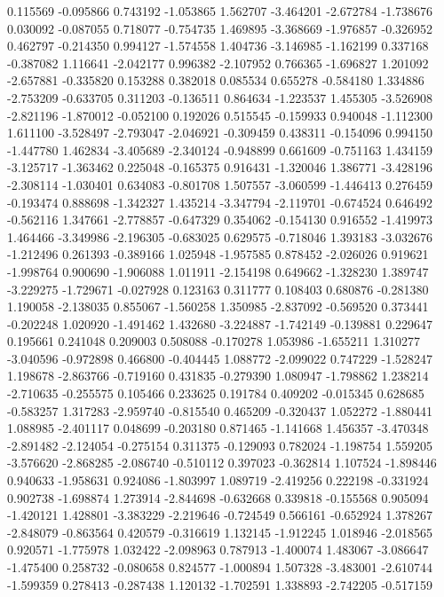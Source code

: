 0.115569
-0.095866
0.743192
-1.053865
1.562707
-3.464201
-2.672784
-1.738676
0.030092
-0.087055
0.718077
-0.754735
1.469895
-3.368669
-1.976857
-0.326952
0.462797
-0.214350
0.994127
-1.574558
1.404736
-3.146985
-1.162199
0.337168
-0.387082
1.116641
-2.042177
0.996382
-2.107952
0.766365
-1.696827
1.201092
-2.657881
-0.335820
0.153288
0.382018
0.085534
0.655278
-0.584180
1.334886
-2.753209
-0.633705
0.311203
-0.136511
0.864634
-1.223537
1.455305
-3.526908
-2.821196
-1.870012
-0.052100
0.192026
0.515545
-0.159933
0.940048
-1.112300
1.611100
-3.528497
-2.793047
-2.046921
-0.309459
0.438311
-0.154096
0.994150
-1.447780
1.462834
-3.405689
-2.340124
-0.948899
0.661609
-0.751163
1.434159
-3.125717
-1.363462
0.225048
-0.165375
0.916431
-1.320046
1.386771
-3.428196
-2.308114
-1.030401
0.634083
-0.801708
1.507557
-3.060599
-1.446413
0.276459
-0.193474
0.888698
-1.342327
1.435214
-3.347794
-2.119701
-0.674524
0.646492
-0.562116
1.347661
-2.778857
-0.647329
0.354062
-0.154130
0.916552
-1.419973
1.464466
-3.349986
-2.196305
-0.683025
0.629575
-0.718046
1.393183
-3.032676
-1.212496
0.261393
-0.389166
1.025948
-1.957585
0.878452
-2.026026
0.919621
-1.998764
0.900690
-1.906088
1.011911
-2.154198
0.649662
-1.328230
1.389747
-3.229275
-1.729671
-0.027928
0.123163
0.311777
0.108403
0.680876
-0.281380
1.190058
-2.138035
0.855067
-1.560258
1.350985
-2.837092
-0.569520
0.373441
-0.202248
1.020920
-1.491462
1.432680
-3.224887
-1.742149
-0.139881
0.229647
0.195661
0.241048
0.209003
0.508088
-0.170278
1.053986
-1.655211
1.310277
-3.040596
-0.972898
0.466800
-0.404445
1.088772
-2.099022
0.747229
-1.528247
1.198678
-2.863766
-0.719160
0.431835
-0.279390
1.080947
-1.798862
1.238214
-2.710635
-0.255575
0.105466
0.233625
0.191784
0.409202
-0.015345
0.628685
-0.583257
1.317283
-2.959740
-0.815540
0.465209
-0.320437
1.052272
-1.880441
1.088985
-2.401117
0.048699
-0.203180
0.871465
-1.141668
1.456357
-3.470348
-2.891482
-2.124054
-0.275154
0.311375
-0.129093
0.782024
-1.198754
1.559205
-3.576620
-2.868285
-2.086740
-0.510112
0.397023
-0.362814
1.107524
-1.898446
0.940633
-1.958631
0.924086
-1.803997
1.089719
-2.419256
0.222198
-0.331924
0.902738
-1.698874
1.273914
-2.844698
-0.632668
0.339818
-0.155568
0.905094
-1.420121
1.428801
-3.383229
-2.219646
-0.724549
0.566161
-0.652924
1.378267
-2.848079
-0.863564
0.420579
-0.316619
1.132145
-1.912245
1.018946
-2.018565
0.920571
-1.775978
1.032422
-2.098963
0.787913
-1.400074
1.483067
-3.086647
-1.475400
0.258732
-0.080658
0.824577
-1.000894
1.507328
-3.483001
-2.610744
-1.599359
0.278413
-0.287438
1.120132
-1.702591
1.338893
-2.742205
-0.517159
